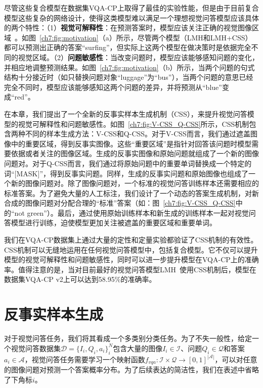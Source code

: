 尽管这些复合模型在数据集VQA-CP上取得了最佳的实验性能，但是由于目前复合模型这些复杂的网络设计，使得这类模型难以满足一个理想视觉问答模型应该具体的两个特性：（1）\textbf{视觉可解释性}：在预测答案时，模型应该关注正确的视觉图像区域~\cite{ross2017right}。如图~\ref{ch7:fig:motivation}（a）所示，尽管两个模型（LMH和LMH+CSS）都可以预测出正确的答案“surfing”，但实际上这两个模型在做决策时是依据完全不同的视觉区域。（2）\textbf{问题敏感性}：当改变问题时，模型应该能够感知问题的变化，并相应地调整预测结果。如图~\ref{ch7:fig:motivation}（b）所示，当两个问题的句式结构十分接近时（如只替换问题对象“luggage”为“bus”），当两个问题的意思已经完全不同时，模型应该能够感知这两个问题的差异，并将预测从“blue”变成“red”。

在本章，我们提出了一个全新的反事实样本生成机制（CSS），来提升视觉问答模型的视觉可解释性和问题敏感性。如图~\ref{ch7:fig:V-CSS_Q-CSS}所示，CSS机制包含两种不同的样本生成方法：V-CSS和Q-CSS。对于V-CSS而言，我们通过遮盖图像中的重要区域，得到反事实图像。这些“重要区域”是指针对回答该问题时模型需要依据或者关注的图像区域。生成的反事实图像和原始问题就组成了一个新的图像问题对。对于Q-CSS而言，我们通过将原始问题中的重要单词替换成一个特定的词“[MASK]”，得到反事实问题。同样，生成的反事实问题和原始图像也组成了一个新的图像问题对。除了图像问题对，一个标准的视觉问答训练样本还需要相应的标准答案。为了避免大量的人工标注，我们设计了一个动态的答案生成机制，对新合成的图像问题对分配合理的“标准”答案（如：图~\ref{ch7:fig:V-CSS_Q-CSS}中的“not green”）。最后，通过使用原始训练样本和新生成的训练样本一起对视觉问答模型进行训练，迫使模型更加关注被遮盖的重要区域和重要单词。

我们在VQA-CP数据集上通过大量的定性和定量实验都验证了CSS机制的有效性。CSS机制可以无缝地运用在任何视觉问答模型中，包括复合模型。它不仅可以提升模型的视觉可解释性和问题敏感性，同时可以进一步提升模型在VQA-CP上的准确率。值得注意的是，当对目前最好的视觉问答模型LMH~\cite{clark2019don}使用CSS机制后，模型在数据集VQA-CP v2上可以达到58.95\%的准确率。


\section{反事实样本生成}

对于视觉问答任务，我们将其看成一个多类别分类任务。为了不失一般性，给定一个视觉问答数据集$\mathcal{D} = \{I_i, Q_i, a_i \}^N_i$包含大量的图像$I_i \in \mathcal{I}$、问题$Q_i \in \mathcal{Q}$和答案$a_i \in \mathcal{A}$，视觉问答任务需要学习一个映射函数$f_{vqa}: \mathcal{I} \times \mathcal{Q} \rightarrow [0, 1]^{|\mathcal{A}|}$，可以对任意的图像问题对预测一个答案概率分布。为了后续表达的简洁性，我们在表述中省略了下角标$i$。

